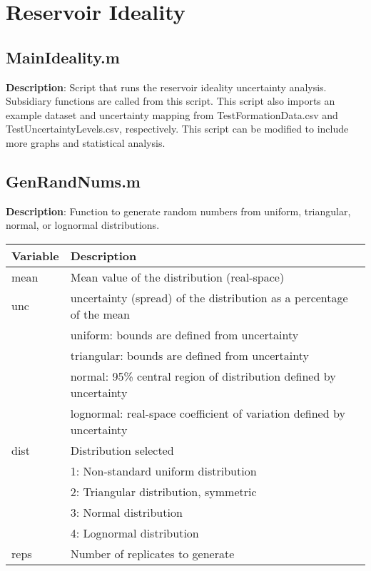 \documentclass[12pt,a4paper]{article}
\begin{document}
\newpage

\section*{Reservoir Ideality}

\subsection*{\textsf{MainIdeality.m}}

\textbf{Description}: Script that runs the reservoir ideality uncertainty analysis. Subsidiary functions are called from this script. This script also imports an example dataset and uncertainty mapping from \textsf{TestFormationData.csv} and \textsf{TestUncertaintyLevels.csv}, respectively. This script can be modified to include more graphs and statistical analysis.

\subsection*{\textsf{GenRandNums.m}}

\textbf{Description}: Function to generate random numbers from uniform, triangular, normal, or lognormal distributions.

\begin{table}[H]
\begin{tabular} {p{2cm} p{11cm}}
\hline
\textbf{Variable} & \textbf{Description}\\
\hline
\textsf{mean} 			 & Mean value of the distribution (real-space)\\
\textsf{unc} & uncertainty (spread) of the distribution as a percentage of the mean\\
 & uniform: bounds are defined from uncertainty\\
 & triangular: bounds are defined from uncertainty\\
 & normal: 95\% central region of distribution defined by uncertainty\\
 & lognormal: real-space coefficient of variation  defined by uncertainty\\
\textsf{dist} & Distribution selected\\
 & 1: Non-standard uniform distribution\\
 & 2: Triangular distribution, symmetric\\
 & 3: Normal distribution\\
 & 4: Lognormal distribution\\
\textsf{reps} & Number of replicates to generate\\
\hline
\end{tabular} 
\end{table}
\end{document}
